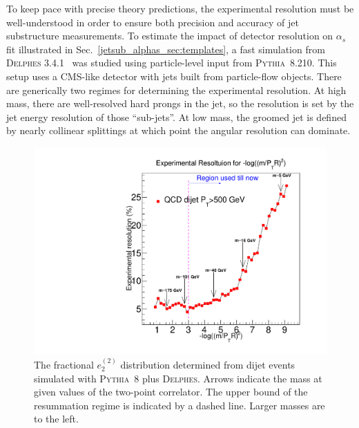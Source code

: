 \documentclass[11pt]{cernrep}
\begin{document}
To keep pace with precise theory predictions, the experimental resolution must be well-understood in order to ensure both precision and accuracy of jet substructure measurements.
%
To estimate the impact of detector resolution on $\alpha_s$ fit illustrated in Sec.~\ref{jetsub_alphas_sec:templates}, a fast simulation from \textsc{Delphes} 3.4.1~\cite{deFavereau:2013fsa} was studied using particle-level input from \textsc{Pythia~8}.210.
%
This setup uses a CMS-like detector with jets built from particle-flow objects.
%
There are generically two regimes for determining the experimental resolution.
%
At high mass, there are well-resolved hard prongs in the jet, so the resolution is set by the jet energy resolution of those ``sub-jets''.
%
At low mass, the groomed jet is defined by nearly collinear splittings at which point the angular resolution can dominate.


\begin{figure}[t]
\begin{center}
\includegraphics[width = 0.49\columnwidth]{jetsub_alphas_Resolution_plot_logrho_updated2.pdf}
\end{center}
\caption{The fractional $e_2^{(2)}$ distribution determined from dijet events simulated with \textsc{Pythia~8} plus \textsc{Delphes}.  Arrows indicate the mass at given values of the two-point correlator.  The upper bound of the resummation regime is indicated by a dashed line.  Larger masses are to the left.}
\label{jetsub_alphas_fig:resolution}
\end{figure}
\end{document}

